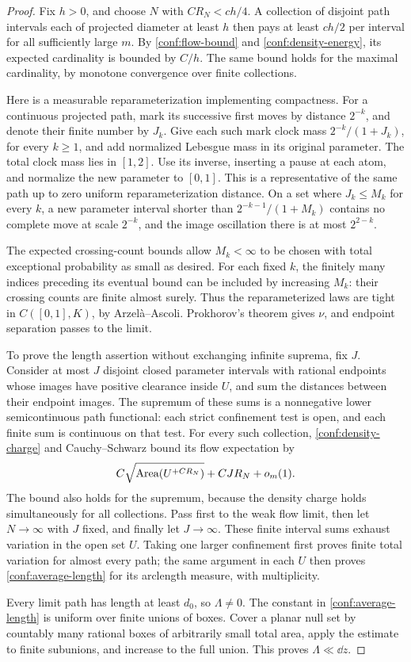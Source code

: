 \begin{proof}
Fix \(h>0\), and choose \(N\) with \(CR_N<ch/4\).  A collection
of disjoint path intervals each of projected diameter at least \(h\)
then pays at least \(ch/2\) per interval for all sufficiently large
\(m\).  By \eqref{conf:flow-bound} and
\eqref{conf:density-energy}, its expected cardinality is bounded by
\(C/h\).  The same bound holds for the maximal cardinality, by
monotone convergence over finite collections.

Here is a measurable reparameterization implementing compactness.
For a continuous projected path, mark its successive first moves by
distance \(2^{-k}\), and denote their finite number by \(J_k\).
Give each such mark clock mass \(2^{-k}/(1+J_k)\), for every
\(k\ge1\), and add normalized Lebesgue mass in its original
parameter.  The total clock mass lies in \([1,2]\).  Use its inverse,
inserting a pause at each atom, and normalize the new parameter to
\([0,1]\).  This is a representative of the same path up to zero
uniform reparameterization distance.  On a set where \(J_k\le M_k\)
for every \(k\), a new parameter interval shorter than
\(2^{-k-1}/(1+M_k)\) contains no complete move at scale \(2^{-k}\),
and the image oscillation there is at most \(2^{2-k}\).

The expected crossing-count bounds allow \(M_k<\infty\) to be
chosen with total exceptional probability as small as desired.  For
each fixed \(k\), the finitely many indices preceding its eventual
bound can be included by increasing \(M_k\): their crossing counts
are finite almost surely.  Thus the reparameterized laws are tight
in \(C([0,1],K)\), by Arzel\`a--Ascoli.  Prokhorov's theorem gives
\(\nu\), and endpoint separation passes to the limit.

To prove the length assertion without exchanging infinite suprema,
fix \(J\).  Consider at most \(J\) disjoint closed parameter intervals
with rational endpoints whose images have positive clearance inside
\(U\), and sum the distances between their endpoint images.  The
supremum of these sums is a nonnegative lower semicontinuous path
functional: each strict confinement test is open, and each finite sum
is continuous on that test.  For every such collection,
\eqref{conf:density-charge} and Cauchy--Schwarz bound its flow
expectation by
\[
 C\sqrt{\operatorname{Area}(U^{+CR_N})}+CJR_N+o_m(1).
\]
The bound also holds for the supremum, because the density charge
holds simultaneously for all collections.  Pass first to the weak
flow limit, then let \(N\to\infty\) with \(J\) fixed, and finally
let \(J\to\infty\).  These finite interval sums exhaust variation
in the open set \(U\).  Taking one larger confinement first proves
finite total variation for almost every path; the same argument in
each \(U\) then proves \eqref{conf:average-length} for its arclength
measure, with multiplicity.

Every limit path has length at least \(d_0\), so \(\Lambda\ne0\).
The constant in \eqref{conf:average-length} is uniform over finite
unions of boxes.  Cover a planar null set by countably many rational
boxes of arbitrarily small total area, apply the estimate to finite
subunions, and increase to the full union.  This proves
\(\Lambda\ll\dd z\).
\end{proof}

